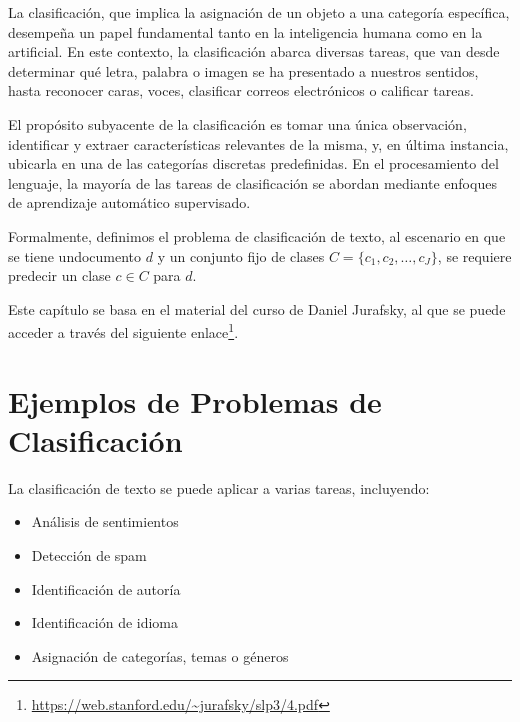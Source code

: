 \documentclass[11pt,fleqn]{book} %
\begin{document}
\pagestyle{empty} %

\tableofcontents %


\pagestyle{fancy} %




La clasificación, que implica la asignación de un objeto a una categoría específica, desempeña un papel fundamental tanto en la inteligencia humana como en la artificial. En este contexto, la clasificación abarca diversas tareas, que van desde determinar qué letra, palabra o imagen se ha presentado a nuestros sentidos, hasta reconocer caras, voces, clasificar correos electrónicos o calificar tareas. 

El propósito subyacente de la clasificación es tomar una única observación, identificar y extraer características relevantes de la misma, y, en última instancia, ubicarla en una de las categorías discretas predefinidas. En el procesamiento del lenguaje, la mayoría de las tareas de clasificación se abordan mediante enfoques de aprendizaje automático supervisado.

\begin{definition}
Formalmente, definimos el problema de clasificación de texto, al escenario en que se tiene undocumento $d$ y un conjunto fijo de clases $C = \{c_1, c_2, \ldots, c_J\}$, se requiere predecir un clase  $c \in C$ para $d$.
\end{definition}



Este capítulo se basa en el material del curso de Daniel Jurafsky, al que se puede acceder a través del siguiente enlace\footnote{\url{https://web.stanford.edu/~jurafsky/slp3/4.pdf}}.

\section{Ejemplos de Problemas de Clasificación}
La clasificación de texto se puede aplicar a varias tareas, incluyendo:

\begin{itemize}
    \item Análisis de sentimientos
    \item Detección de spam
    \item Identificación de autoría
    \item Identificación de idioma
    \item Asignación de categorías, temas o géneros
\end{itemize}
\end{document}
